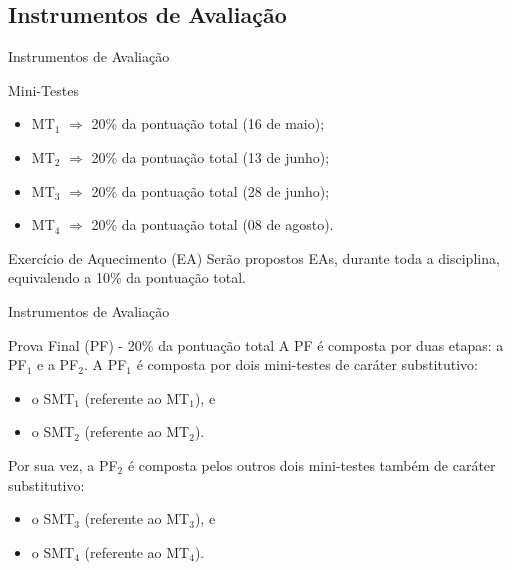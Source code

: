 \documentclass[xcolor=dvipsnames,table]{beamer}
\begin{document}
	\subsection{Instrumentos de Avaliação}
	\begin{frame}{Instrumentos de Avaliação}
		\begin{block}{Mini-Testes}
			\begin{itemize}
				\item MT$_1$ $\Rightarrow$ 20\% da pontuação total (16 de maio);
				\item MT$_2$ $\Rightarrow$ 20\% da pontuação total (13 de junho);
				\item MT$_3$ $\Rightarrow$ 20\% da pontuação total (28 de junho);
				\item MT$_4$ $\Rightarrow$  20\% da pontuação total (08 de agosto).
			\end{itemize}
		\end{block} \pause
		\begin{block}{Exercício de Aquecimento (EA)}
			Serão propostos EAs, durante toda a disciplina, equivalendo a 10\% da pontuação total.
		\end{block}
	\end{frame}

	\begin{frame}{Instrumentos de Avaliação}
		\begin{block}{Prova Final (PF) - 20\% da pontuação total}
			A PF é composta por duas etapas: a PF$_1$ e a PF$_2$. 
			A PF$_1$ é composta por dois mini-testes de caráter substitutivo: \pause 
			\begin{itemize}
				\item o SMT$_1$ (referente ao MT$_1$), e 
				\item o SMT$_2$ (referente ao MT$_2$).
			\end{itemize} \pause
			Por sua vez, a PF$_2$ é composta pelos outros dois mini-testes também de caráter substitutivo:  \pause
			\begin{itemize}
				\item o SMT$_3$ (referente ao MT$_3$), e 
				\item o SMT$_4$ (referente ao MT$_4$).
			\end{itemize}
		\end{block}
	\end{frame}
	
\end{document}
